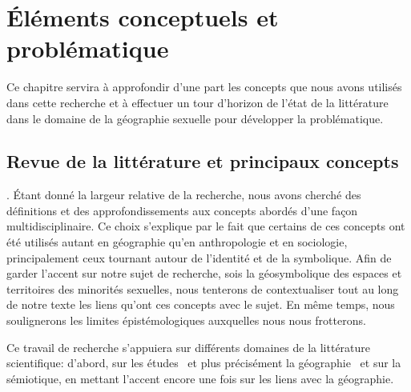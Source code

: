 \chapter{Éléments conceptuels et problématique}
\label{cha:elements_conceptuels_et_problematique}


Ce chapitre servira à approfondir d'une part les concepts que nous avons utilisés dans cette recherche et à effectuer un tour d'horizon de l'état de la littérature dans le domaine de la géographie sexuelle pour développer la problématique.

\section{Revue de la littérature et principaux concepts}
\label{sec:revue_de_la_litterature_et_principaux_concepts} 

.
Étant donné la largeur relative de la recherche, nous avons cherché des définitions et des approfondissements aux concepts abordés d'une façon multidisciplinaire. 
Ce choix s'explique par le fait que certains de ces concepts ont été utilisés autant en géographie qu'en anthropologie et en sociologie, principalement ceux tournant autour de l'identité et de la symbolique. 
Afin de garder l’accent sur notre sujet de recherche, sois la géosymbolique des espaces et territoires des minorités sexuelles, nous tenterons de contextualiser tout au long de notre texte les liens qu'ont ces concepts avec le sujet. 
En même temps, nous soulignerons les limites épistémologiques auxquelles nous nous frotterons. 

Ce travail de recherche s’appuiera sur différents domaines de la littérature scientifique: d'abord, sur les études \qus\ et plus précisément la géographie \qu\ et sur la sémiotique, en mettant l'accent encore une fois sur les liens avec la géographie. 

